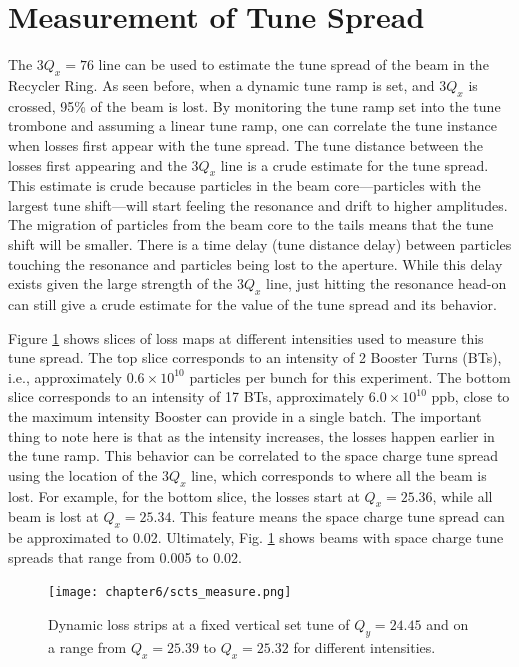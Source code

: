 \section{Measurement of Tune Spread}

The $3Q_x=76$ line can be used to estimate the tune spread of the beam in the Recycler Ring. As seen before, when a dynamic tune ramp is set, and $3Q_x$ is crossed, 95\% of the beam is lost. By monitoring the tune ramp set into the tune trombone and assuming a linear tune ramp, one can correlate the tune instance when losses first appear with the tune spread. The tune distance between the losses first appearing and the $3Q_x$ line is a crude estimate for the tune spread. This estimate is crude because particles in the beam core---particles with the largest tune shift---will start feeling the resonance and drift to higher amplitudes. The migration of particles from the beam core to the tails means that the tune shift will be smaller. There is a time delay (tune distance delay) between particles touching the resonance and particles being lost to the aperture. While this delay exists given the large strength of the $3Q_x$ line, just hitting the resonance head-on can still give a crude estimate for the value of the tune spread and its behavior.

Figure \ref{fig:dynamictunespread} shows slices of loss maps at different intensities used to measure this tune spread. The top slice corresponds to an intensity of 2 Booster Turns (BTs), i.e., approximately $0.6\times10^{10}$ particles per bunch for this experiment. The bottom slice corresponds to an intensity of 17 BTs, approximately $6.0\times10^{10}$ ppb, close to the maximum intensity Booster can provide in a single batch. The important thing to note here is that as the intensity increases, the losses happen earlier in the tune ramp. This behavior can be correlated to the space charge tune spread using the location of the $3Q_x$ line, which corresponds to where all the beam is lost. For example, for the bottom slice, the losses start at $Q_x=25.36$, while all beam is lost at $Q_x=25.34$. This feature means the space charge tune spread can be approximated to 0.02. Ultimately, Fig. \ref{fig:dynamictunespread} shows beams with space charge tune spreads that range from 0.005 to 0.02.

\newpage
\begin{figure}[H]
    \centering
    \texttt{[image: chapter6/scts\_measure.png]}
    \caption{Dynamic loss strips at a fixed vertical set tune of $Q_y=24.45$ and on a range from $Q_x=25.39$ to $Q_x=25.32$ for different intensities.}
    \label{fig:dynamictunespread}
\end{figure}
\newpage

